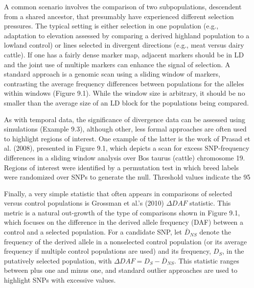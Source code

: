 \documentclass{article}
\begin{document}
A common scenario involves the comparison of two subpopulations, descendent from a shared ancestor, that presumably have experienced different selection pressures. The typical setting is either selection in one population (e.g., adaptation to elevation assessed by comparing a derived highland population to a lowland control) or lines selected in divergent directions (e.g., meat versus dairy cattle). If one has a fairly dense marker map, adjacent markers should be in LD and the joint use of multiple markers can enhance the signal of selection. A standard approach is a genomic scan using a sliding window of markers, contrasting the average frequency differences between populations for the alleles within windows (Figure 9.1). While the window size is arbitrary, it should be no smaller than the average size of an LD block for the populations being compared.

As with temporal data, the significance of divergence data can be assessed using simulations (Example 9.3), although other, less formal approaches are often used to highlight regions of interest. One example of the latter is the work of Prasad et al. (2008), presented in Figure 9.1, which depicts a scan for excess SNP-frequency differences in a sliding window analysis over Bos taurus (cattle) chromosome 19. Regions of interest were identified by a permutation test in which breed labels were randomized over SNPs to generate the null. Threshold values indicate the 95%

Finally, a very simple statistic that often appears in comparisons of selected versus control populations is Grossman et al.'s (2010)  $ \Delta DAF $ statistic. This metric is a natural out-growth of the type of comparisons shown in Figure 9.1, which focuses on the difference in the derived allele frequency (DAF) between a control and a selected population. For a candidate SNP, let  $ \overline{D}_{NS} $ denote the frequency of the derived allele in a nonselected control population (or its average frequency if multiple control populations are used) and its frequency,  $ D_{S} $, in the putatively selected population, with  $ \Delta DAF = D_{S} - \overline{D}_{NS} $. This statistic ranges between plus one and minus one, and standard outlier approaches are used to highlight SNPs with excessive values.
\end{document}
